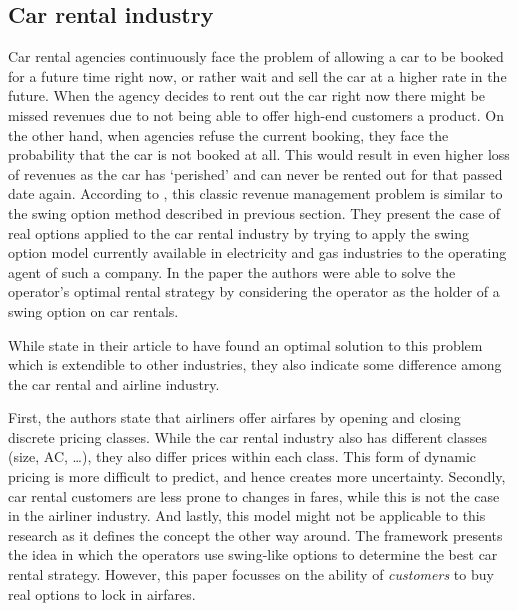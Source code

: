 \subsection{Car rental industry}
Car rental agencies continuously face the problem of allowing a car to be booked for a future time right now, or rather wait and sell the car at a higher rate in the future. When the agency decides to rent out the car right now there might be missed revenues due to not being able to offer high-end customers a product. On the other hand, when agencies refuse the current booking, they face the probability that the car is not booked at all. This would result in even higher loss of revenues as the car has `perished' and can never be rented out for that passed date again. According to , this classic revenue management problem is similar to the swing option method described in previous section. They present the case of real options applied to the car rental industry by trying to apply the swing option model currently available in electricity and gas industries to the operating agent of such a company. In the paper the authors were able to solve the operator's optimal rental strategy by considering the operator as the holder of a swing option on car rentals.

While  state in their article to have found an optimal solution to this problem which is extendible to other industries, they also indicate some difference among the car rental and airline industry.

First, the authors state that airliners offer airfares by opening and closing discrete pricing classes. While the car rental industry also has different classes (size, AC, \ldots), they also differ prices within each class. This form of dynamic pricing is more difficult to predict, and hence creates more uncertainty. Secondly, car rental customers are less prone to changes in fares, while this is not the case in the airliner industry. And lastly, this model might not be applicable to this research as it defines the concept the other way around. The framework presents the idea in which the operators use swing-like options to determine the best car rental strategy. However, this paper focusses on the ability of \emph{customers} to buy real options to lock in airfares.


